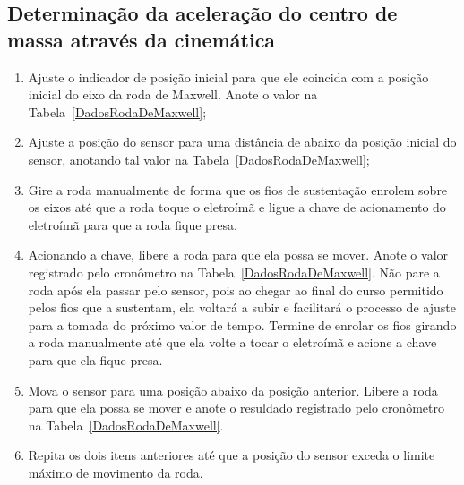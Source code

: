 \subsection{Determinação da aceleração do centro de massa através da cinemática}
\begin{enumerate}
	\item Ajuste o indicador de posição inicial para que ele coincida com a posição inicial do eixo da roda de Maxwell. Anote o valor na Tabela~\ref{DadosRodaDeMaxwell};
	\item Ajuste a posição do sensor para uma distância de  abaixo da posição inicial do sensor, anotando tal valor na Tabela~\ref{DadosRodaDeMaxwell};
	\item Gire a roda manualmente de forma que os fios de sustentação enrolem sobre os eixos até que a roda toque o eletroímã e ligue a chave de acionamento do eletroímã para que a roda fique presa.
	\item Acionando a chave, libere a roda para que ela possa se mover. Anote o valor registrado pelo cronômetro na Tabela~\ref{DadosRodaDeMaxwell}. Não pare a roda após ela passar pelo sensor, pois ao chegar ao final do curso permitido pelos fios que a sustentam, ela voltará a subir e facilitará o processo de ajuste para a tomada do próximo valor de tempo. Termine de enrolar os fios girando a roda manualmente até que ela volte a tocar o eletroímã e acione a chave para que ela fique presa.
	\item Mova o sensor para uma posição  abaixo da posição anterior. Libere a roda para que ela possa se mover e anote o resuldado registrado pelo cronômetro na Tabela~\ref{DadosRodaDeMaxwell}.
	\item Repita os dois itens anteriores até que a posição do sensor exceda o limite máximo de movimento da roda.
\end{enumerate}

\cleardoublepage


\vspace{15mm}

